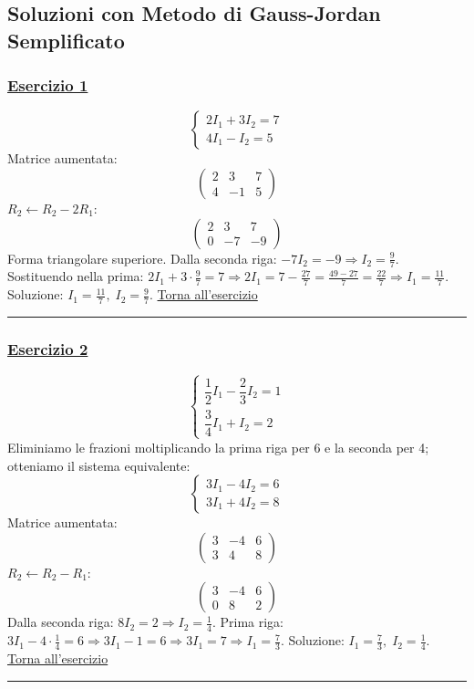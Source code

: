 \subsection{Soluzioni con Metodo di Gauss-Jordan Semplificato}


\subsubsection*{\hyperref[ex:1]{Esercizio 1}}
\[
\begin{cases}
2I_1 + 3I_2 = 7 \\
4I_1 - I_2 = 5
\end{cases}
\]
Matrice aumentata:
\[
\left(\begin{array}{cc|c}
2 & 3 & 7 \\
4 & -1 & 5
\end{array}\right)
\]
\(R_2 \leftarrow R_2 - 2R_1\):
\[
\left(\begin{array}{cc|c}
2 & 3 & 7 \\
0 & -7 & -9
\end{array}\right)
\]
Forma triangolare superiore. Dalla seconda riga: \(-7I_2 = -9 \Rightarrow I_2 = \frac{9}{7}\).
Sostituendo nella prima: \(2I_1 + 3\cdot\frac{9}{7} = 7 \Rightarrow 2I_1 = 7 - \frac{27}{7} = \frac{49-27}{7} = \frac{22}{7} \Rightarrow I_1 = \frac{11}{7}\).
Soluzione: \(\displaystyle I_1 = \frac{11}{7},\; I_2 = \frac{9}{7}\). \hfill \hyperlink{ex:1}{Torna all'esercizio}\\
\hrule

\subsubsection*{\hyperref[ex:2]{Esercizio 2}}
\[
\begin{cases}
\dfrac{1}{2}I_1 - \dfrac{2}{3}I_2 = 1 \\[6pt]
\dfrac{3}{4}I_1 + I_2 = 2
\end{cases}
\]
Eliminiamo le frazioni moltiplicando la prima riga per 6 e la seconda per 4; otteniamo il sistema equivalente:
\[
\begin{cases}
3I_1 - 4I_2 = 6 \\
3I_1 + 4I_2 = 8
\end{cases}
\]
Matrice aumentata:
\[
\left(\begin{array}{cc|c}
3 & -4 & 6 \\
3 & 4 & 8
\end{array}\right)
\]
\(R_2 \leftarrow R_2 - R_1\):
\[
\left(\begin{array}{cc|c}
3 & -4 & 6 \\
0 & 8 & 2
\end{array}\right)
\]
Dalla seconda riga: \(8I_2 = 2 \Rightarrow I_2 = \frac{1}{4}\).
Prima riga: \(3I_1 - 4\cdot\frac{1}{4} = 6 \Rightarrow 3I_1 -1 = 6 \Rightarrow 3I_1 = 7 \Rightarrow I_1 = \frac{7}{3}\).
Soluzione: \(\displaystyle I_1 = \frac{7}{3},\; I_2 = \frac{1}{4}\). \hfill \hyperlink{ex:2}{Torna all'esercizio}\\
\hrule

